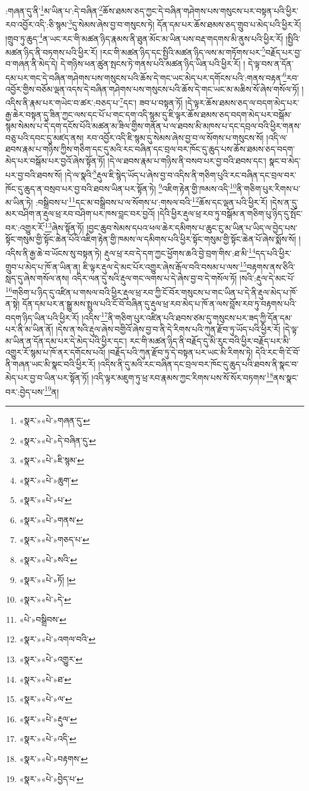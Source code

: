 :གཞན་དུ་ནི་\footnote{«སྣར་»«པེ་»གཞན་དུ་}མ་ཡིན་པ་:དེ་བཞིན་\footnote{«སྣར་»«པེ་»དེ་བཞིན་དུ་}ཆོས་ཐམས་ཅད་ཀྱང་དེ་བཞིན་གཤེགས་པས་གསུངས་པར་བསྟན་པའི་ཕྱིར་རབ་འབྱོར་འདི་:ཅི་སྙམ་\footnote{«སྣར་»«པེ་»ཇི་སྙམ་}དུ་སེམས་ཞེས་བྱ་བ་གསུངས་ཏེ། དོན་དམ་པར་ཆོས་ཐམས་ཅད་གྲུབ་པ་མེད་པའི་ཕྱིར་རོ། །གྲུབ་ཏུ་ཆུད་\footnote{«སྣར་»«པེ་»ཆུག་}ན་ཡང་རང་གི་མཚན་ཉིད་རྣམས་ནི་ཐུན་མོང་མ་ཡིན་པས་བརྡ་གདགས་མི་ནུས་པའི་ཕྱིར་རོ། །སྤྱིའི་མཚན་ཉིད་ནི་བཏགས་པའི་ཕྱིར་རོ། །རང་གི་མཚན་ཉིད་དང་སྤྱིའི་མཚན་ཉིད་ལས་མ་གཏོགས་པར་\footnote{«སྣར་»«པེ་»པ་}བརྗོད་པར་བྱ་བ་གཞན་ནི་མེད་དེ། དེ་གཉིས་ཕན་ཚུན་སྤངས་ཏེ་གནས་པའི་མཚན་ཉིད་ཡིན་པའི་ཕྱིར་རོ། །
དེ་ལྟ་བས་ན་དོན་དམ་པར་གང་དེ་བཞིན་གཤེགས་པས་གསུངས་པའི་ཆོས་དེ་གང་ཡང་མེད་པར་དགོངས་པའི་:གནས་བརྟན་\footnote{«སྣར་»«པེ་»གནས་}རབ་འབྱོར་གྱིས་བཅོམ་ལྡན་འདས་དེ་བཞིན་གཤེགས་པས་གསུངས་པའི་ཆོས་དེ་གང་ཡང་མ་མཆིས་སོ་ཞེས་གསོལ་ཏོ། །འདིས་ནི་རྣམ་པར་གཡེང་བ་ཚར་:བཅད་པ་\footnote{«སྣར་»«པེ་»གཅད་པ་}དང་། ཟབ་པ་བསྟན་ཏོ། །དེ་ལྟར་ཆོས་ཐམས་ཅད་ལ་བདག་མེད་པར་རྒྱ་ཆེར་བསྟན་དུ་ཟིན་ཀྱང་ལས་དང་པོ་པ་གང་དག་འདི་སྙམ་དུ་ཇི་ལྟར་ཆོས་ཐམས་ཅད་བདག་མེད་པར་བསྒོམ་སྙམ་སེམས་པ་དེ་དག་དངོས་པོའི་མཚན་མ་ཟིལ་གྱིས་གནོན་པ་ལ་ཐབས་མི་མཁས་པ་དང་དབྲལ་བའི་ཕྱིར་གནས་བཅུ་པའི་དབང་དུ་མཛད་ནས། རབ་འབྱོར་འདི་ཇི་སྙམ་དུ་སེམས་ཞེས་བྱ་བ་ལ་སོགས་པ་གསུངས་སོ། །འདི་ལ་ཐབས་རྣམ་པ་གཉིས་ཀྱིས་གཅིག་དང་དུ་མའི་རང་བཞིན་དང་བྲལ་བར་ཁོང་དུ་ཆུད་པས་ཆོས་ཐམས་ཅད་བདག་མེད་པར་བསྒོམ་པར་བྱའོ་ཞེས་སྟོན་ཏོ། །དེ་ལ་ཐབས་རྣམ་པ་གཉིས་ནི་བསབ་པར་བྱ་བའི་ཐབས་དང་། སྣང་བ་མེད་པར་བྱ་བའི་ཐབས་སོ། །དེ་ལ་སྣའི་\footnote{«སྣར་»«པེ་»སའི་}རྡུལ་ཇི་སྙེད་ཡོད་པ་ཞེས་བྱ་བ་འདིས་ནི་གཅིག་པུའི་རང་བཞིན་དང་བྲལ་བར་ཁོང་དུ་ཆུད་ན་བསྲབ་པར་བྱ་བའི་ཐབས་ཡིན་པར་སྟོན་ཏེ། \footnote{«སྣར་»«པེ་»ཏོ། ། }འཇིག་རྟེན་གྱི་ཁམས་འདི་\footnote{«སྣར་»«པེ་»དེ་}ནི་གཅིག་པུར་རིགས་པ་མ་ཡིན་ཏེ། :བསྒྲིབས་པ་\footnote{«པེ་»བསྒྲིབས་}དང་མ་བསྒྲིབས་པ་ལ་སོགས་པ་:གསལ་བའི་\footnote{«སྣར་»«པེ་»འགལ་བའི་}ཆོས་དང་ལྡན་པའི་ཕྱིར་རོ། །དེས་ན་དུ་མར་བཤིག་ན་རྡུལ་ཕྲ་རབ་བཤིག་པར་ཁས་བླང་བར་བྱའོ། །དེའི་ཕྱིར་རྡུལ་ཕྲ་རབ་ཏུ་བསྒོམ་ན་གཅིག་པུ་ཉིད་དུ་སྤོང་བར་:འགྱུར་རོ་\footnote{«སྣར་»«པེ་»འགྱུར་}ཞེས་སྟོན་ཏོ། །བྱང་ཆུབ་སེམས་དཔའ་ཕལ་ཆེར་དམིགས་པ་ཆུང་ངུ་མ་ཡིན་པ་ཡིད་ལ་བྱེད་པས་སྟོང་གསུམ་གྱི་སྟོང་ཆེན་པོའི་འཇིག་རྟེན་གྱི་ཁམས་ལ་དམིགས་པའི་ཕྱིར་སྟོང་གསུམ་གྱི་སྟོང་ཆེན་པོ་ཞེས་སྨོས་སོ། །འདིས་ནི་རྒྱ་ཆེ་བ་ཡོངས་སུ་བསྟན་ཏེ། རྡུལ་ཕྲ་རབ་དེ་དག་ཀྱང་ཕྱོགས་ཆའི་བྱེ་བྲག་གིས་:ཐ་མི་\footnote{«སྣར་»«པེ་»ཐ་}དད་པའི་ཕྱིར་གྲུབ་པ་མེད་པ་ཁོ་ན་ཡིན་ན། ཇི་ལྟར་རྡུལ་དེ་མང་པོར་འགྱུར་ཞེས་རྒོལ་བའི་བསམ་པ་ལས་\footnote{«སྣར་»«པེ་»ལ་}བརྟགས་ནས་ཅིའི་སླད་དུ་ཞེས་གསོལ་ནས། འདིར་ལན་དུ་སའི་རྡུལ་གང་ལགས་པ་དེ་ཞེས་བྱ་བ་དེ་གསོལ་ཏོ། །སའི་:རྡུལ་དེ་མང་པོ་\footnote{«སྣར་»«པེ་»རྡུལ་}གཅིག་པ་ཉིད་དུ་འཛིན་པ་གསལ་བའི་ཕྱིར་རྡུལ་ཕྲ་རབ་ཀྱི་ངོ་བོར་གསུངས་པ་གང་ཡིན་པ་དེ་ནི་རྡུལ་མེད་པ་ཁོ་ན་སྟེ། དོན་དམ་པར་ན་སྒྱུ་མས་སྤྲུལ་པའི་ངོ་བོ་བཞིན་དུ་རྡུལ་ཕྲ་རབ་མེད་པ་ཁོ་ན་ལས་བློས་རབ་ཏུ་བརྟགས་པའི་བདག་ཉིད་ཡིན་པའི་ཕྱིར་རོ། །འདིས་\footnote{«སྣར་»«པེ་»འདི་}ནི་གཅིག་པུར་འཛིན་པའི་ཐབས་ཙམ་དུ་གསུངས་པར་ཟད་ཀྱི་དོན་དམ་པར་ནི་མ་ཡིན་ནོ། །དེས་ན་སའི་རྡུལ་ཞེས་བགྱིའོ་ཞེས་བྱ་བ་ནི་དེ་རིགས་པའི་ཀུན་རྫོབ་ཏུ་ཡོད་པའི་ཕྱིར་རོ། །དེ་ལྟ་མ་ཡིན་ན་དོན་དམ་པར་དེ་མེད་པའི་ཕྱིར་དང་། རང་གི་མཚན་ཉིད་ནི་བརྗོད་དུ་མི་རུང་བའི་ཕྱིར་བརྗོད་པར་མི་འགྱུར་རོ་སྙམ་པ་ཁོ་ནར་དགོངས་པའོ། །བརྗོད་པའི་ཀུན་རྫོབ་ཏུ་དེ་བསྟན་པར་ཡང་མི་རིགས་ཏེ། དེའི་རང་གི་ངོ་བོ་ནི་གཞན་ཡང་མི་སྣང་བའི་ཕྱིར་རོ། །འདིས་ནི་དུ་མའི་རང་བཞིན་དང་བྲལ་བར་ཁོང་དུ་ཆུད་པའི་ཐབས་ནི་སྣང་བ་མེད་པར་བྱ་བ་ཡིན་པར་སྟོན་ཏོ། །འདི་ལྟར་མཇུག་ཏུ་ཕྲ་རབ་རྣམས་ཀྱང་རིགས་པས་སོ་སོར་བཏགས་\footnote{«སྣར་»«པེ་»བརྟགས་}ནས་སྣང་བར་:བྱེད་པས་\footnote{«སྣར་»«པེ་»བྱེད་པ་}ན། 